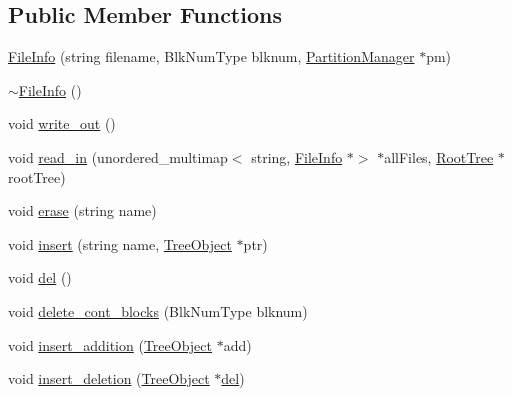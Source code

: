 \subsection*{Public Member Functions}
\begin{DoxyCompactItemize}
\item 
\mbox{\hyperlink{class_file_info_a3586bb4f50c4a0f63ff4ea0a1e56ce9c}{File\+Info}} (string filename, Blk\+Num\+Type blknum, \mbox{\hyperlink{class_partition_manager}{Partition\+Manager}} $\ast$pm)
\item 
\mbox{\hyperlink{class_file_info_ab771dfaca29680c93810af82a7a99958}{$\sim$\+File\+Info}} ()
\item 
void \mbox{\hyperlink{class_file_info_a8e835f000ddfd0f1097ccfa7e7801a09}{write\+\_\+out}} ()
\item 
void \mbox{\hyperlink{class_file_info_a2bf60d4be97347f3d7a15cf839afca7d}{read\+\_\+in}} (unordered\+\_\+multimap$<$ string, \mbox{\hyperlink{class_file_info}{File\+Info}} $\ast$$>$ $\ast$all\+Files, \mbox{\hyperlink{class_root_tree}{Root\+Tree}} $\ast$root\+Tree)
\item 
void \mbox{\hyperlink{class_file_info_ae058242283d3317eaf2b79428e6137f6}{erase}} (string name)
\item 
void \mbox{\hyperlink{class_file_info_ad93a84b63e417b07aa68b619051ab746}{insert}} (string name, \mbox{\hyperlink{class_tree_object}{Tree\+Object}} $\ast$ptr)
\item 
void \mbox{\hyperlink{class_file_info_a2ca34d945ed1208f227a249ba72ee427}{del}} ()
\item 
void \mbox{\hyperlink{class_file_info_a8c6b58cb9f7e9978064291ef81380e01}{delete\+\_\+cont\+\_\+blocks}} (Blk\+Num\+Type blknum)
\item 
void \mbox{\hyperlink{class_file_info_a7f788f31521c535646eebfa9959bbb24}{insert\+\_\+addition}} (\mbox{\hyperlink{class_tree_object}{Tree\+Object}} $\ast$add)
\item 
void \mbox{\hyperlink{class_file_info_a278136b1d68f55dc56a4be807076fc0d}{insert\+\_\+deletion}} (\mbox{\hyperlink{class_tree_object}{Tree\+Object}} $\ast$\mbox{\hyperlink{class_file_info_a2ca34d945ed1208f227a249ba72ee427}{del}})
\end{DoxyCompactItemize}
